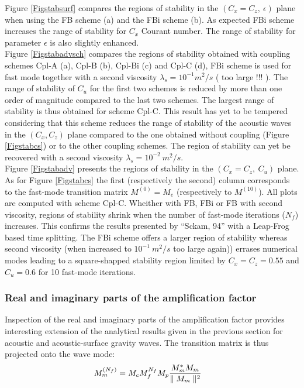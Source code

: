 \documentclass[a4paper]{article}
\numberwithin{equation}{section}
\begin{document}
Figure \ref{Figstabsurf} compares the regions of stability in the  $(C_x=C_z,\ \epsilon)$ plane when using the FB scheme (a) and the FBi scheme (b). As expected FBi scheme increases the range of stability for $C_x$ Courant number. The range of stability for parameter $\epsilon$ is also slightly enhanced.\\

Figure \ref{Figstabadvsch} compares the regions of stability obtained with coupling schemes Cpl-A (a),  Cpl-B (b), Cpl-Bi (c) and Cpl-C (d), FBi scheme is used for fast mode together with a second viscosity $\lambda_s=10^{-1} m^2/s$ (\color{red} too large !!! \color{black}). The range of stability of $C_u$ for the first two schemes is reduced by more than one order of magnitude compared to the last two schemes. The largest range of stability is thus obtained for scheme Cpl-C. This result has yet to be tempered considering that this scheme reduces the range of stability of the acoustic waves in the $(C_x, C_z)$ plane compared to the one obtained without coupling (Figure \ref{Figstabcs}) or to the other coupling schemes. The region of stability can yet be recovered with a second viscosity $\lambda_s=10^{-2}\ m^2/s$.\\

Figure \ref{Figstabadv} presents the regions of stability in the $(C_x=C_z,\ C_u)$ plane. As for Figure \ref{Figstabcs} the first (respectively the second) column corresponds to the fast-mode transition matrix $M^{(0)}=M_e$ (respectively to $M^{(10)}$). All plots are computed with scheme Cpl-C. Wheither with FB, FBi or FB with second viscosity, regions  of stability shrink when the number of fast-mode iterations ($N_f$) increases. This confirms the results presented by ``Sckam, 94'' with a Leap-Frog based time splitting. The FBi scheme offers a larger region of stability whereas second viscosity (when increased to $10^{-1}\ m^2/s$ \color{red} too large again\color{black})) errases numerical modes leading to a square-shapped stability region limited by $C_x = C_z = 0.55$ and $C_u = 0.6$ for 10 fast-mode iterations.

\subsubsection{Real and imaginary parts of the amplification factor}

Inspection of the real and imaginary parts of the amplification factor provides interesting extension of the analytical results given in the previous section for acoustic and acoustic-surface gravity waves. The transition matrix is thus projected onto the wave mode:
\begin{equation}
   \begin{split}
    \displaystyle
     & M_{m}^{(N_f)} = M_c M_f^{N_f} M_p \frac{M_m^* M_m}{\parallel M_m \parallel^2}
   \end{split}
\end{equation}
\end{document}
